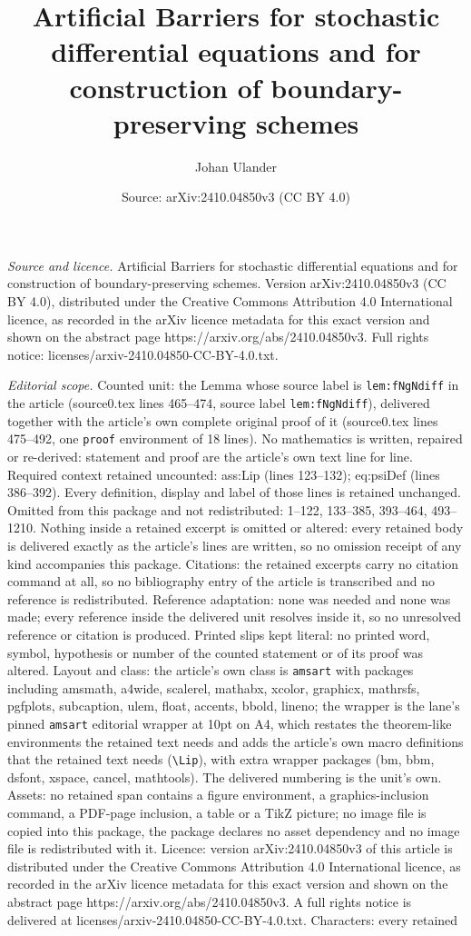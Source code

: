 \documentclass[10pt,a4paper]{amsart}
\title[Artificial Barriers for stochastic differential equations an]{Artificial Barriers for stochastic differential equations and for construction of boundary-preserving schemes}
\author{Johan Ulander}
\date{Source: arXiv:2410.04850v3 (CC BY 4.0)}
\begin{document}
\maketitle

\noindent\emph{Source and licence.} Artificial Barriers for stochastic differential equations and for construction of boundary-preserving schemes. Version arXiv:2410.04850v3 (CC BY 4.0), distributed under the Creative Commons Attribution 4.0 International licence, as recorded in the arXiv licence metadata for this exact version and shown on the abstract page https://arxiv.org/abs/2410.04850v3. Full rights notice: licenses/arxiv-2410.04850-CC-BY-4.0.txt.\par\smallskip

\noindent\textit{Editorial scope.} Counted unit: the Lemma whose source label is \texttt{lem:fNgNdiff} in the article (source0.tex lines 465--474, source label \texttt{lem:fNgNdiff}), delivered together with the article's own complete original proof of it (source0.tex lines 475--492, one \texttt{proof} environment of 18 lines). No mathematics is written, repaired or re-derived: statement and proof are the article's own text line for line. Required context retained uncounted: ass:Lip (lines 123--132); eq:psiDef (lines 386--392). Every definition, display and label of those lines is retained unchanged. Omitted from this package and not redistributed: 1--122, 133--385, 393--464, 493--1210. Nothing inside a retained excerpt is omitted or altered: every retained body is delivered exactly as the article's lines are written, so no omission receipt of any kind accompanies this package. Citations: the retained excerpts carry no citation command at all, so no bibliography entry of the article is transcribed and no reference is redistributed. Reference adaptation: none was needed and none was made; every reference inside the delivered unit resolves inside it, so no unresolved reference or citation is produced. Printed slips kept literal: no printed word, symbol, hypothesis or number of the counted statement or of its proof was altered. Layout and class: the article's own class is \texttt{amsart} with packages including amsmath, a4wide, scalerel, mathabx, xcolor, graphicx, mathrsfs, pgfplots, subcaption, ulem, float, accents, bbold, lineno; the wrapper is the lane's pinned \texttt{amsart} editorial wrapper at 10pt on A4, which restates the theorem-like environments the retained text needs and adds the article's own macro definitions that the retained text needs (\texttt{\textbackslash Lip}), with extra wrapper packages (bm, bbm, dsfont, xspace, cancel, mathtools). The delivered numbering is the unit's own. Assets: no retained span contains a figure environment, a graphics-inclusion command, a PDF-page inclusion, a table or a TikZ picture; no image file is copied into this package, the package declares no asset dependency and no image file is redistributed with it. Licence: version arXiv:2410.04850v3 of this article is distributed under the Creative Commons Attribution 4.0 International licence, as recorded in the arXiv licence metadata for this exact version and shown on the abstract page https://arxiv.org/abs/2410.04850v3. A full rights notice is delivered at licenses/arxiv-2410.04850-CC-BY-4.0.txt. Characters: every retained 
\end{document}
